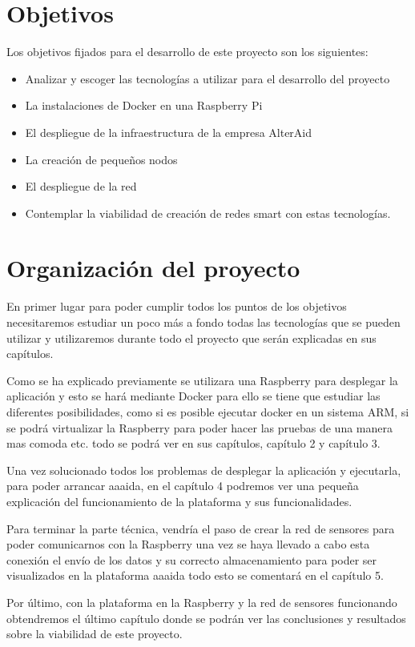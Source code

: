 \section{Objetivos}

Los objetivos fijados para el desarrollo de este proyecto son los siguientes:

\begin{itemize}
\item Analizar y escoger las tecnologías a utilizar para el desarrollo del proyecto
\item La instalaciones de Docker en una Raspberry Pi
\item El despliegue de la infraestructura de la empresa AlterAid
\item La creación de pequeños nodos
\item El despliegue de la red
\item Contemplar la viabilidad de creación de redes smart con estas tecnologías. 
\end{itemize}

\section{Organización del proyecto}

En primer lugar para poder cumplir todos los puntos de los objetivos necesitaremos estudiar un poco más a fondo todas las tecnologías que se pueden utilizar y utilizaremos durante todo el proyecto que serán explicadas en sus capítulos. 

Como se ha explicado previamente se utilizara una Raspberry para desplegar la aplicación y esto se hará mediante Docker para ello se tiene que estudiar las diferentes posibilidades, como si es posible ejecutar docker en un sistema ARM, si se podrá virtualizar la Raspberry para poder hacer las pruebas de una manera mas comoda etc. todo se podrá ver en sus capítulos, capítulo 2 y capítulo 3. 

Una vez solucionado todos los problemas de desplegar la aplicación y ejecutarla, para poder arrancar aaaida, en el capítulo 4 podremos ver una pequeña explicación del funcionamiento de la plataforma y sus funcionalidades. 

Para terminar la parte técnica, vendría el paso de crear la red de sensores para poder comunicarnos con la Raspberry una vez se haya llevado a cabo esta conexión el envío de los datos y su correcto almacenamiento para poder ser visualizados en la plataforma aaaida todo esto se comentará en el capítulo 5. 

Por último, con la plataforma en la Raspberry y la red de sensores funcionando obtendremos el último capítulo donde se podrán ver las conclusiones y resultados sobre la viabilidad de este proyecto. 


